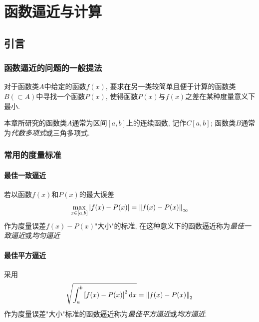 \chapter{函数逼近与计算}

\section{引言}

\subsection{函数逼近的问题的一般提法}

对于函数类$A$中给定的函数$f(x)$, 要求在另一类较简单且便于计算的函数类$B(\subset A)$中寻找一个函数$P(x)$, 使得函数$P(x)$与$f(x)$之差在某种度量意义下最小.

本章所研究的函数类$A$通常为区间$[a,b]$上的连续函数, 记作$C[a,b]$; 函数类$B$通常为\emph{代数多项式}或三角多项式.

\subsection{常用的度量标准}

\subsubsection{最佳一致逼近}

\begin{definition}[最佳一致逼近]
    若以函数$f(x)$和$P(x)$的最大误差
    \begin{equation*}
        \max_{x\in[a,b]}\abs{f(x)-P(x)}=\norm{f(x)-P(x)}_\infty
    \end{equation*}
    作为度量误差$f(x)-P(x)$"大小"的标准, 在这种意义下的函数逼近称为\emph{最佳一致逼近}或\emph{均匀逼近}
\end{definition}

\subsubsection{最佳平方逼近}

\begin{definition}[最佳平方逼近]
    采用
    \begin{equation*}
        \sqrt{\int_a^b\left[f(x)-P(x)\right]^2\dd{x}}=\norm{f(x)-P(x)}_2
    \end{equation*}
    作为度量误差"大小"标准的函数逼近称为\emph{最佳平方逼近}或\emph{均方逼近}.
\end{definition}

